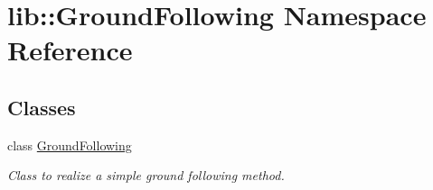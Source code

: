 \hypertarget{namespacelib_1_1GroundFollowing}{\section{lib\-:\-:\-Ground\-Following \-Namespace \-Reference}
\label{namespacelib_1_1GroundFollowing}
}
\subsection*{\-Classes}
\begin{DoxyCompactItemize}
\item 
class \hyperlink{classlib_1_1GroundFollowing_1_1GroundFollowing}{\-Ground\-Following}
\begin{DoxyCompactList}\small\item\em \-Class to realize a simple ground following method. \end{DoxyCompactList}\end{DoxyCompactItemize}
